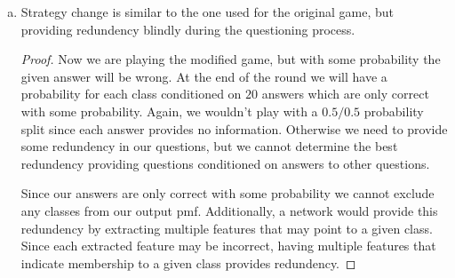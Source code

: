 \documentclass[11pt]{article}
\begin{document}
\begin{enumerate}[(a)]
\begin{proof}
		Otherwise, we can attempt to provide some redundency in our questions
		to help minimize the uncertainty about answers. We can tailor the
		amount of overlap based on the probability of receiving a correct or
		incorrect answer, with greater overlap required as the probabilities
		approach $0.5 / 0.5$. Furthermore, we can trivially handle the case
		where we are more likely to receive an incorrect answer by negating the
		given answer.
		\newline

		The chain rule can be written as

		\begin{align}
			p\Big( x_{n-1} \vert \hat x_{n-2}, \hat x_{n-3}, \dots,
				\hat x_{0}\Big)
			&= \frac{
			p\Big( x_{n-1}, \hat x_{n-2}, \hat x_{n-3}, \dots,
				\hat x_{0}\Big)
			}{
			p\Big(\hat x_{n-2}, \hat x_{n-3}, \dots,
				\hat x_{0}\Big)
			}
		\end{align}

		Tweaking the overlap of questions would exert control over the joint
		probability seen in the denominator (and partially in numerator).

	\end{proof}

\item
	\begin{solution}
		Strategy change is similar to the one used for the original game, but
		providing redundency blindly during the questioning process.
	\end{solution}
	\begin{proof}
		Now we are playing the modified game, but with some probability the
		given answer will be wrong. At the end of the round we will have a
		probability for each class conditioned on $20$ answers which are only
		correct with some probability. Again, we wouldn't play with a $0.5 /
		0.5$ probability split since each answer provides no information.
		Otherwise we need to provide some redundency in our questions, but we
		cannot determine the best redundency providing questions conditioned on
		answers to other questions.
		\newline

		Since our answers are only correct with some probability we cannot
		exclude any classes from our output pmf. Additionally, a network would
		provide this redundency by extracting multiple features that may point
		to a given class. Since each extracted feature may be incorrect, having
		multiple features that indicate membership to a given class provides
		redundency.

	\end{proof}

\end{enumerate}
\end{document}
